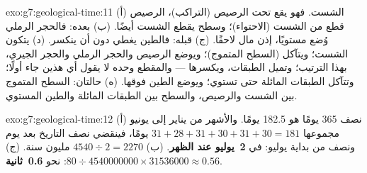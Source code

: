 \begin{solution}{exo:g7:geological-time:11}
(أ) الشست. فهو يقع تحت الرصيص (التراكب)،  الرصيص قطع من الشست
(الاحتواء)؛ وسطح  يقطع الشست أيضًا. (ب) بعده: فالحجر الرملي وُضع
مستويًا، إذن مال لاحقًا. (ج) قبله: فالطين يغطي  دون أن ينكسر. (د)
يتكون الشست؛ ويتآكل (السطح المتموج)؛ ويوضع الرصيص والحجر الرملي والحجر
الجيري، بهذا الترتيب؛ وتميل الطبقات، ويكسرها  --- والمقطع وحده لا يقول
أي هذين جاء أولًا؛ وتتآكل الطبقات المائلة  حتى تستوي؛ ويوضع الطين
فوقها. (ه) حالتان: السطح المتموج بين الشست والرصيص، والسطح بين الطبقات
المائلة والطين المستوي.
\end{solution}

\begin{solution}{exo:g7:geological-time:12}
(أ) نصف 365 يومًا هو 182.5 يومًا. والأشهر من يناير إلى يونيو مجموعها
$31+28+31+30+31+30 = 181$ يومًا، فينقضي نصف التاريخ بعد يوم ونصف من بداية
يوليو: في \textbf{2~يوليو عند الظهر}. (ب) $4540 \div 2 = 2270$ مليون
سنة. (ج) $80 \div \num{4540000000} \times \num{31536000} \approx 0.56$:
نحو \textbf{0.6~ثانية}.
\end{solution}

